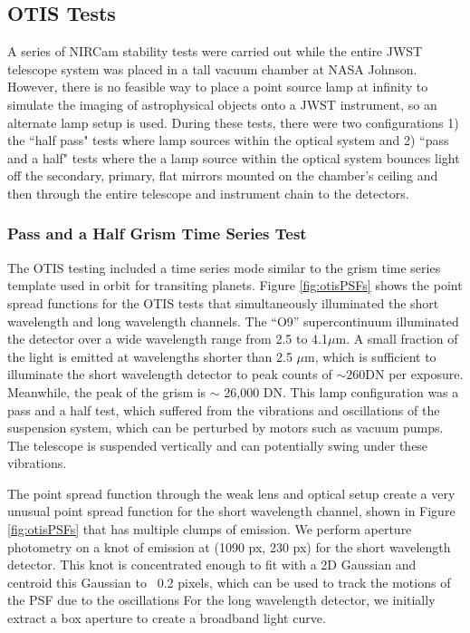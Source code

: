 \documentclass{aastex62}
\begin{document}
\subsection{OTIS Tests}

A series of NIRCam stability tests were carried out while the entire JWST telescope system was placed in a tall vacuum chamber at NASA Johnson.
However, there is no feasible way to place a point source lamp at infinity to simulate the imaging of astrophysical objects onto a JWST instrument, so an alternate lamp setup is used.
During these tests, there were two configurations 1) the ``half pass" tests where lamp sources within the optical system and 2) ``pass and a half" tests where the a lamp source within the optical system bounces light off the secondary, primary, flat mirrors mounted on the chamber's ceiling and then through the entire telescope and instrument chain to the detectors.

\subsubsection{Pass and a Half Grism Time Series Test}
The OTIS testing included a time series mode similar to the grism time series template used in orbit for transiting planets.
Figure \ref{fig:otisPSFs} shows the point spread functions for the OTIS tests that simultaneously illuminated the short wavelength and long wavelength channels.
The ``O9'' supercontinuum illuminated the detector over a wide wavelength range from 2.5 to 4.1$\mu$m.
A small fraction of the light is emitted at wavelengths shorter than 2.5 $\mu$m, which is sufficient to illuminate the short wavelength detector to peak counts of $\sim 260$DN per exposure.
Meanwhile, the peak of the grism is $\sim$ 26,000 DN.
This lamp configuration was a pass and a half test, which suffered from the vibrations and oscillations of the suspension system, which can be perturbed by motors such as vacuum pumps.
The telescope is suspended vertically and can potentially swing under these vibrations.

The point spread function through the weak lens and optical setup create a very unusual point spread function for the short wavelength channel, shown in Figure \ref{fig:otisPSFs} that has multiple clumps of emission.
We perform aperture photometry on a knot of emission at (1090 px, 230 px) for the short wavelength detector.
This knot is concentrated enough to fit with a 2D Gaussian and centroid this Gaussian to ~0.2 pixels, which can be used to track the motions of the PSF due to the oscillations
For the long wavelength detector, we initially extract a box aperture to create a broadband light curve.
\end{document}
